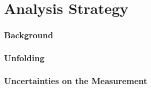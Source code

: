 \part {\LARGE{Analysis Strategy}}
\label{sec:Analysis Strategy}

\section{Background}
\label{sec:Bkg}


\section{Unfolding}
\label{sec:Unfolding}


\section{Uncertainties on the Measurement}
\label{sec:Uncertainties}


